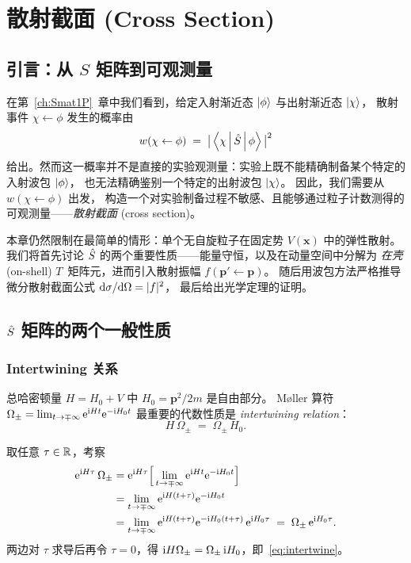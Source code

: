 \chapter{散射截面 (Cross Section)}\label{ch:cross}

\section{引言：从 $S$ 矩阵到可观测量}

在第~\ref{ch:Smat1P}~章中我们看到，给定入射渐近态 $\ket{\phi}$ 与出射渐近态 $\ket{\chi}$，
散射事件 $\chi \leftarrow \phi$ 发生的概率由
\begin{equation}
w(\chi \leftarrow \phi) \;=\; \big|\left\langle \chi \,\middle|\, \hat{S} \,\middle|\, \phi \right\rangle\big|^2
\label{eq:w-chi-phi}
\end{equation}
给出。然而这一概率并不是直接的实验观测量：实验上既不能精确制备某个特定的入射波包 $\ket{\phi}$，
也无法精确鉴别一个特定的出射波包 $\ket{\chi}$。
因此，我们需要从 $w(\chi\leftarrow\phi)$ 出发，
构造一个对实验制备过程不敏感、且能够通过粒子计数测得的可观测量——\emph{散射截面} (cross section)。

本章仍然限制在最简单的情形：单个无自旋粒子在固定势 $V(\bm{x})$ 中的弹性散射。
我们将首先讨论 $\hat{S}$ 的两个重要性质——能量守恒，以及在动量空间中分解为
\emph{在壳} (on-shell) $T$~矩阵元，进而引入散射振幅 $f(\bm{p}'\!\leftarrow\!\bm{p})$。
随后用波包方法严格推导微分散射截面公式 $\mathrm{d}\sigma/\mathrm{d}\Omega = |f|^2$，
最后给出光学定理的证明。

\section{$\hat{S}$ 矩阵的两个一般性质}

\subsection{Intertwining 关系}

总哈密顿量 $H = H_0 + V$ 中 $H_0 = \bm{p}^2/2m$ 是自由部分。
M\o{}ller 算符 $\Omega_\pm = \lim_{t\to\mp\infty} \mathrm{e}^{\mathrm{i} H t} \mathrm{e}^{-\mathrm{i} H_0 t}$
最重要的代数性质是 \emph{intertwining relation}：
\begin{equation}
H \,\Omega_\pm \;=\; \Omega_\pm \,H_0.
\label{eq:intertwine}
\end{equation}

\begin{proof*}
取任意 $\tau \in \mathbb{R}$，考察
\begin{align*}
\mathrm{e}^{\mathrm{i} H\tau}\,\Omega_\pm
&= \mathrm{e}^{\mathrm{i} H\tau}\Big[\lim_{t\to\mp\infty} \mathrm{e}^{\mathrm{i} Ht}\mathrm{e}^{-\mathrm{i} H_0 t}\Big] \\
&= \lim_{t\to\mp\infty} \mathrm{e}^{\mathrm{i} H(t+\tau)}\mathrm{e}^{-\mathrm{i} H_0 t} \\
&= \lim_{t\to\mp\infty} \mathrm{e}^{\mathrm{i} H(t+\tau)}\mathrm{e}^{-\mathrm{i} H_0 (t+\tau)}\,\mathrm{e}^{\mathrm{i} H_0 \tau}
\;=\; \Omega_\pm \,\mathrm{e}^{\mathrm{i} H_0 \tau}.
\end{align*}
两边对 $\tau$ 求导后再令 $\tau = 0$，得 $\mathrm{i} H \Omega_\pm = \Omega_\pm \,\mathrm{i} H_0$，即~\eqref{eq:intertwine}。
\end{proof*}


